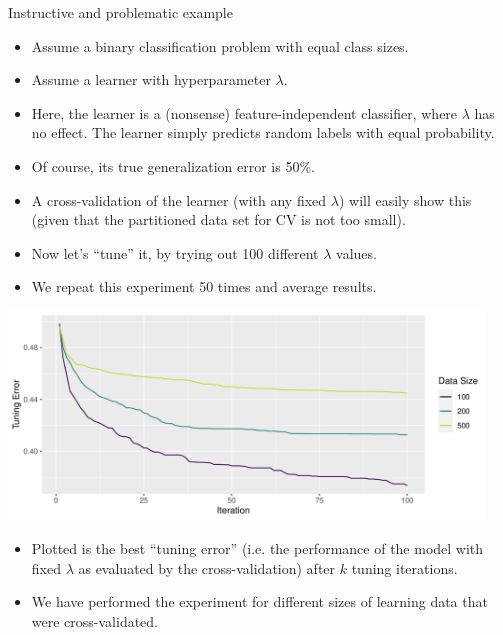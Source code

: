 \documentclass[11pt,compress,t,notes=noshow, xcolor=table]{beamer}
\newenvironment{knitrout}{}{} %
\begin{document}
\begin{vbframe}{Instructive and problematic example}
\begin{itemize}
    \item Assume a binary classification problem with equal class sizes.
    \item Assume a learner with hyperparameter $\lambda$.
    \item Here, the learner is a (nonsense) feature-independent classifier,
          where $\lambda$ has no effect. The learner simply
          predicts random labels with equal probability.
    \item Of course, its true generalization error is 50\%.
    \item A cross-validation of the learner (with any fixed $\lambda$) will easily show this
      (given that the partitioned data set for CV is not too small).
    \item Now let's \enquote{tune} it, by trying out 100 different $\lambda$ values.
    \item We repeat this experiment 50 times and average results.
\end{itemize}

\framebreak

\begin{knitrout}\scriptsize
{}\color{fgcolor}

{\centering \includegraphics[width=0.95\textwidth]{figure/cart_tuning_nestintro_1} 

}



\end{knitrout}

\begin{itemize}
\item Plotted is the best \enquote{tuning error} (i.e. the performance of the model with fixed $\lambda$ as evaluated by the cross-validation) after $k$ tuning iterations.
\item We have performed the experiment for different sizes of learning data
      that were cross-validated.
\end{itemize}


\end{vbframe}
\end{document}
